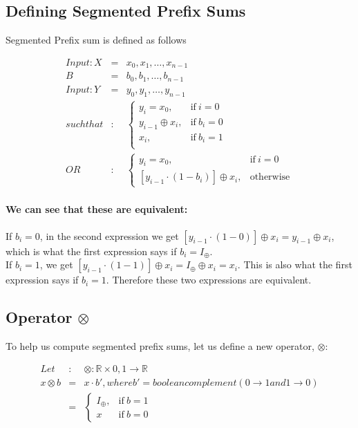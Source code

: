\documentclass[11pt]{article}
\begin{document}
\subsection{Defining Segmented Prefix Sums}

Segmented Prefix sum is defined as follows

  \begin{eqnarray*}
    Input: X &=& {x_0, x_1, \dots , x_{n-1}}\\
    B &=& {b_0, b_1, \dots , b_{n-1}}\\
    Input: Y &=& {y_0, y_1, \dots , y_{n-1}}\\
    such that&:&
    \begin{cases}
      y_i = x_0, & \text{if}\ i = 0 \\
      y_{i-1} \oplus x_i, & \text{if}\ b_i = 0 \\
      x_i, & \text{if}\ b_i = 1 \\
    \end{cases}
    \\OR &:&
    \begin{cases}
      y_i = x_0, & \text{if}\ i = 0 \\
      [y_{i-1} \cdot (1 - b_i) ] \oplus x_i, & \text{otherwise}
    \end{cases}
  \end{eqnarray*}

\paragraph{We can see that these are equivalent:} 

If $b_i = 0$, in the second expression we get $[y_{i-1} \cdot (1-0)] \oplus x_i = y_{i-1} \oplus x_i$, which is what the first expression says if $b_i = I_\oplus$.\\
If $b_i = 1$, we get $[y_{i-1} \cdot (1 - 1)] \oplus x_i = I_\oplus \oplus x_i = x_i$. This is also what the first expression says if $b_i = 1$. Therefore these two expressions are equivalent.

\subsection{Operator $\otimes$} 
To help us compute segmented prefix sums, let us define a new operator, $\otimes$:

  \begin{eqnarray*}
    Let&:& \otimes: \mathbb{R} \times {0, 1} \longrightarrow \mathbb{R}\\
    x \otimes b &=& x \cdot b', where b' = boolean complement (0 \longrightarrow 1 and 1 \longrightarrow 0)\\
    &=&
    \begin{cases}
      I_\oplus, & \text{if}\ b = 1 \\
      x & \text{if}\ b = 0
    \end{cases}
  \end{eqnarray*}
\end{document}
